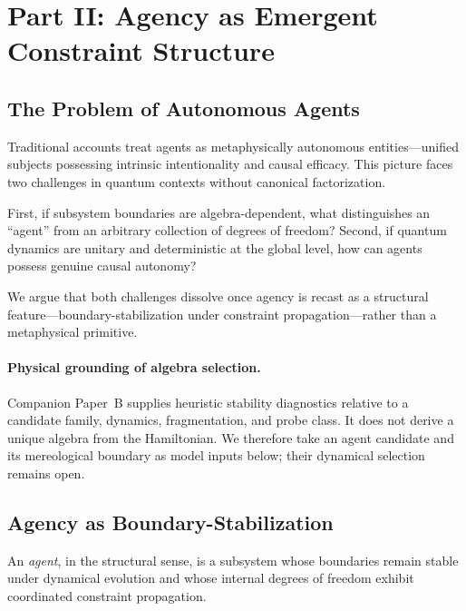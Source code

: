 \documentclass[12pt,a4paper,openany]{book}
\begin{document}
\section{Part II: Agency as Emergent Constraint Structure}
\label{H-C-sec:agency}

\subsection{The Problem of Autonomous Agents}
\label{H-C-sec:II.1}

Traditional accounts treat agents as metaphysically autonomous entities—unified subjects possessing intrinsic intentionality and causal efficacy. This picture faces two challenges in quantum contexts without canonical factorization.

First, if subsystem boundaries are algebra-dependent, what distinguishes an ``agent'' from an arbitrary collection of degrees of freedom? Second, if quantum dynamics are unitary and deterministic at the global level, how can agents possess genuine causal autonomy?

We argue that both challenges dissolve once agency is recast as a structural feature---boundary-stabilization under constraint propagation---rather than a metaphysical primitive.

\paragraph{Physical grounding of algebra selection.}
Companion Paper~B \cite{Liu2026PaperB} supplies heuristic stability diagnostics relative to a candidate family, dynamics, fragmentation, and probe class.  It does not derive a unique algebra from the Hamiltonian.  We therefore take an agent candidate and its mereological boundary as model inputs below; their dynamical selection remains open.

\subsection{Agency as Boundary-Stabilization}
\label{H-C-sec:II.2}

An \emph{agent}, in the structural sense, is a subsystem whose boundaries remain stable under dynamical evolution and whose internal degrees of freedom exhibit coordinated constraint propagation.
\end{document}
